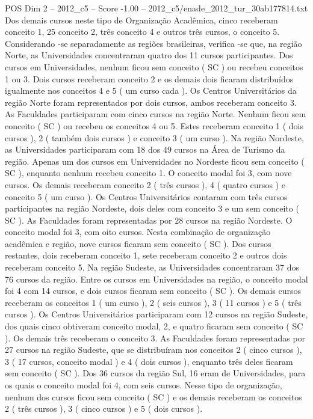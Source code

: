 \begin{textsample}{POS Dim 2 – 2012\_c5 – Score -1.00 – 2012\_c5/enade\_2012\_tur\_30ab177814.txt}
Dos demais cursos neste tipo de Organização Acadêmica, cinco receberam conceito 1, 25 conceito 2, três conceito 4 e outros três cursos, o conceito 5.
Considerando -se separadamente as regiões brasileiras, verifica -se que, na região Norte, as Universidades concentraram quatro dos 11 cursos participantes.
Dos cursos em Universidades, nenhum ficou sem conceito ( SC ) ou recebeu conceitos 1 ou 3.
Dois cursos receberam conceito 2 e os demais dois ficaram distribuídos igualmente nos conceitos 4 e 5 ( um curso cada ).
Os Centros Universitários da região Norte foram representados por dois cursos, ambos receberam conceito 3.
As Faculdades participaram com cinco cursos na região Norte.
Nenhum ficou sem conceito ( SC ) ou recebeu os conceitos 4 ou 5.
Estes receberam conceito 1 ( dois cursos ), 2 ( também dois cursos ) e conceito 3 ( um curso ).
Na região Nordeste, as Universidades participaram com 18 dos 49 cursos na Área de Turismo da região.
Apenas um dos cursos em Universidades no Nordeste ficou sem conceito ( SC ), enquanto nenhum recebeu conceito 1.
O conceito modal foi 3, com nove cursos.
Os demais receberam conceito 2 ( três cursos ), 4 ( quatro cursos ) e conceito 5 ( um curso ).
Os Centros Universitários contaram com três cursos participantes na região Nordeste, dois deles com conceito 3 e um sem conceito ( SC ).
As Faculdades foram representadas por 28 cursos na região Nordeste.
O conceito modal foi 3, com oito cursos.
Nesta combinação de organização acadêmica e região, nove cursos ficaram sem conceito ( SC ).
Dos cursos restantes, dois receberam conceito 1, sete receberam conceito 2 e outros dois receberam conceito 5.
Na região Sudeste, as Universidades concentraram 37 dos 76 cursos da região.
Entre os cursos em Universidades na região, o conceito modal foi 4 com 14 cursos, e dois cursos ficaram sem conceito ( SC ).
Os demais cursos receberam os conceitos 1 ( um curso ), 2 ( seis cursos ), 3 ( 11 cursos ) e 5 ( três cursos ).
Os Centros Universitários participaram com 12 cursos na região Sudeste, dos quais cinco obtiveram conceito modal, 2, e quatro ficaram sem conceito ( SC ).
Os demais três receberam o conceito 3.
As Faculdades foram representadas por 27 cursos na região Sudeste, que se distribuíram nos conceitos 2 ( cinco cursos ), 3 ( 17 cursos, conceito modal ) e 4 ( dois cursos ), enquanto três deles ficaram sem conceito ( SC ).
Dos 36 cursos da região Sul, 16 eram de Universidades, para os quais o conceito modal foi 4, com seis cursos.
Nesse tipo de organização, nenhum dos cursos ficou sem conceito ( SC ) e os demais receberam os conceitos 2 ( três cursos ), 3 ( cinco cursos ) e 5 ( dois cursos ).

\end{textsample}
